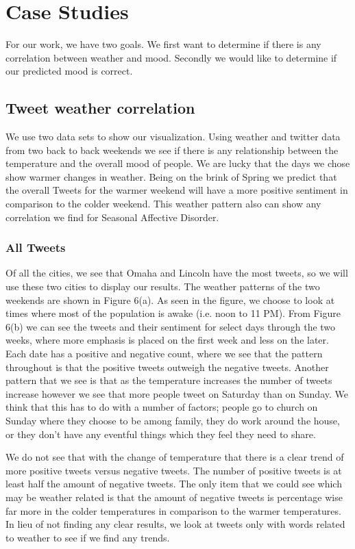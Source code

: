 \documentclass[journal]{vgtc}                %
\begin{document}
\section{Case Studies}
For our work, we have two goals. We first want to determine if there is any correlation between weather and mood. Secondly we would like to determine if our predicted mood is correct. 

\subsection{Tweet weather correlation}
We use two data sets to show our visualization. Using weather and twitter data from two back to back weekends we see if there is any relationship between the temperature and the overall mood of people. We are lucky that the days we chose show warmer changes in weather. Being on the brink of Spring we predict that the overall Tweets for the warmer weekend will have a more positive sentiment in comparison to the colder weekend. This weather pattern also can show any correlation we find for Seasonal Affective Disorder.

\subsubsection{All Tweets}
Of all the cities, we see that Omaha and Lincoln have the most tweets, so we will use these two cities to display our results. The weather patterns of the two weekends are shown in Figure 6(a). As seen in the figure, we choose to look at times where most of the population is awake (i.e. noon to 11 PM). From Figure 6(b) we can see the tweets and their sentiment for select days through the two weeks, where more emphasis is placed on the first week and less on the later. Each date has a positive and negative count, where we see that the pattern throughout is that the positive tweets outweigh the negative tweets. Another pattern that we see is that as the temperature increases the number of tweets increase however we see that more people tweet on Saturday than on Sunday. We think that this has to do with a number of factors; people go to church on Sunday where they choose to be among family, they do work around the house, or they don't have any eventful things which they feel they need to share. 

We do not see that with the change of temperature that there is a clear trend of more positive tweets versus negative tweets. The number of positive tweets is at least half the amount of negative tweets. The only item that we could see which may be weather related is that the amount of negative tweets is percentage wise far more in the colder temperatures in comparison to the warmer temperatures. In lieu of not finding any clear results, we look at tweets only with words related to weather to see if we find any trends.
\end{document}
